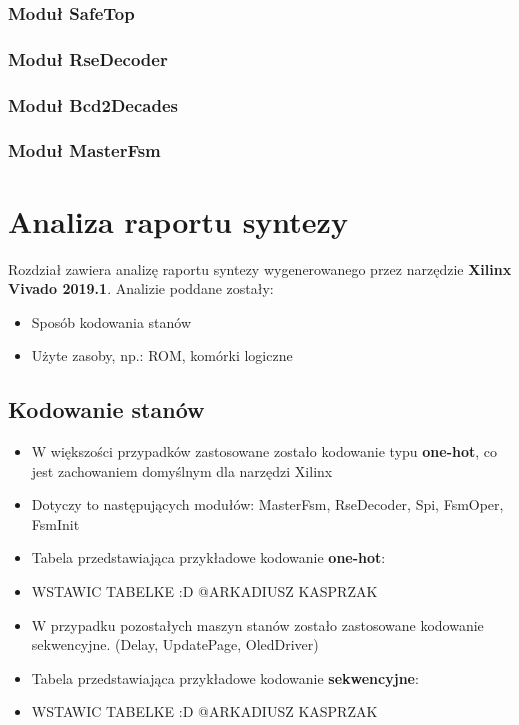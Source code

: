 \documentclass[12pt] {article}
\begin{document}
\subsubsection{Moduł SafeTop}

\subsubsection{Moduł RseDecoder}

\subsubsection{Moduł Bcd2Decades}

\subsubsection{Moduł MasterFsm}



\section{Analiza raportu syntezy}

Rozdział zawiera analizę raportu syntezy wygenerowanego przez narzędzie \textbf{Xilinx Vivado 2019.1}. Analizie poddane zostały:
\begin{itemize}
\item Sposób kodowania stanów
\item Użyte zasoby, np.: ROM, komórki logiczne
\end{itemize}

\subsection{Kodowanie stanów}
\begin{itemize}
\item W większości przypadków zastosowane zostało kodowanie typu \textbf{one-hot}, co jest zachowaniem domyślnym dla narzędzi Xilinx
\item Dotyczy to następujących modułów: MasterFsm, RseDecoder, Spi, FsmOper, FsmInit
\item Tabela przedstawiająca przykładowe kodowanie \textbf{one-hot}:
\item WSTAWIC TABELKE :D @ARKADIUSZ KASPRZAK
\item W przypadku pozostałych maszyn stanów zostało zastosowane kodowanie sekwencyjne. (Delay, UpdatePage, OledDriver)
\item Tabela przedstawiająca przykładowe kodowanie \textbf{sekwencyjne}:
\item WSTAWIC TABELKE :D @ARKADIUSZ KASPRZAK
\end{itemize}
\end{document}

